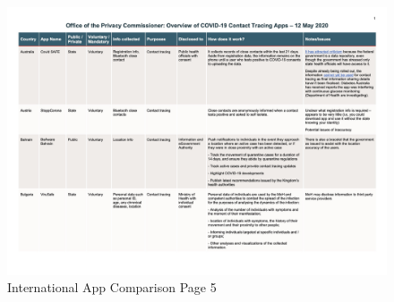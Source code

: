 \documentclass{scrreprt}
\begin{document}
\begin{figure}[H]
	\centering
	\includegraphics[page=5, width=0.9\linewidth]{2020-05-12-OPC-Comparison-of-COVID-19-Apps-colours}
	\caption{International App Comparison Page 5}
	\label{fig:5_2020-05-12-OPC-Comparison-of-COVID-19-Apps-colours}
\end{figure}
\end{document}
